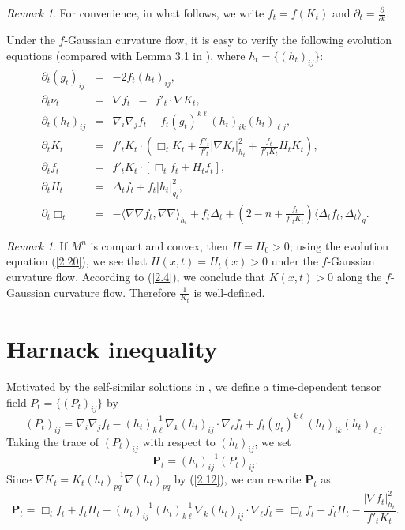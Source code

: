 \documentclass{amsart}
\theoremstyle{definition}
\theoremstyle{remark}
\newtheorem{remark}[theorem]{Remark}
\numberwithin{equation}{section}
\begin{document}
\begin{remark} \label{r2.1}For convenience, in what follows, we write
$f_{t}=f(K_{t})$ and $\partial_{t}=\frac{\partial}{\partial t}$.
\end{remark}

Under the $f$-Gaussian curvature flow, it is easy to verify the following evolution equations (compared with Lemma 3.1 in \cite{C2}), where $h_{t}=\{(h_{t})_{ij}\}$:
\begin{eqnarray}
\partial_{t}(g_{t})_{ij}&=&-2f_{t}(h_{t})_{ij},\label{2.15}\\
\partial_{t}\nu_{t}&=&\nabla f_{t} \ \ = \ \ f'_{t}
\cdot\nabla K_{t},\label{2.16}\\
\partial_{t}(h_{t})_{ij}&=&\nabla_{i}\nabla_{j}f_{t}-f_{t}(g_{t})^{k\ell}
(h_{t})_{ik}(h_{t})_{\ell j},\label{2.17}\\
\partial_{t}K_{t}&=&f'_{t}K_{t}\cdot\left(\Box_{t} K_{t}+
\frac{f''_{t}}{f'_{t}}|\nabla K_{t}|^{2}_{h_{t}}+\frac{f_{t}}{f'_{t}K_{t}}H_{t}K_{t}\right),\label{2.18}\\
\partial_{t}f_{t}&=&f'_{t}K_{t}\cdot\left[\Box_{t} f_{t}+H_{t}f_{t}\right],\label{2.19}\\
\partial_{t}H_{t}&=&\Delta_{t} f_{t}+f_{t}|h_{t}|^{2}_{g_{t}},\label{2.20}\\
\partial_{t}\Box_{t}&=&-\langle\nabla\nabla f_{t},
\nabla\nabla\rangle_{h_{t}}
+f_{t}\Delta_{t}+\left(2-n+\frac{f_{t}}{f'_{t}K_{t}}\right)\langle\Delta_{t} f_{t},
\Delta_{t}\rangle_{g}.\label{2.21}
\end{eqnarray}

\begin{remark} \label{r2.2}If $M^{n}$ is compact and convex, then $H=H_{0}>0$;
using the evolution equation (\ref{2.20}), we see that $H(x,t)=H_{t}(x)>0$ under the $f$-Gaussian curvature
flow. According to (\ref{2.4}), we conclude that $K(x,t)>0$ along the
$f$-Gaussian curvature flow. Therefore $\frac{1}{K_{t}}$ is well-defined.
\end{remark}

\section{Harnack inequality}
Motivated by the self-similar solutions in \cite{C2}, we define a time-dependent
tensor field $P_{t}=\{(P_{t})_{ij}\}$ by
\begin{equation}
(P_{t})_{ij}=\nabla_{i}\nabla_{j}f_{t}-(h_{t})^{-1}_{k\ell}
\nabla_{k}(h_{t})_{ij}\cdot\nabla_{\ell}f_{t}+f_{t}(g_{t})^{k\ell}(h_{t})_{ik}(h_{t})_{\ell j}.\label{3.1}
\end{equation}
Taking the trace of $(P_{t})_{ij}$ with respect to $(h_{t})_{ij}$, we set
\begin{equation}
\mathbf{P}_{t}=(h_{t})^{-1}_{ij}(P_{t})_{ij}.\label{3.2}
\end{equation}
Since $\nabla K_{t}=K_{t}(h_{t})^{-1}_{pq}\nabla (h_{t})_{pq}$ by (\ref{2.12}), we can rewrite
$\mathbf{P}_{t}$ as
\begin{equation}
\mathbf{P}_{t}=\Box_{t}f_{t}+f_{t}H_{t}-(h_{t})^{-1}_{ij}(h_{t})^{-1}_{k\ell}
\nabla_{k}(h_{t})_{ij}\cdot\nabla_{\ell}f_{t}=\Box_{t} f_{t}+f_{t}H_{t}-\frac{|\nabla f_{t}|^{2}_{h_{t}}}{f'_{t}K_{t}}.\label{3.3}
\end{equation}
\end{document}
